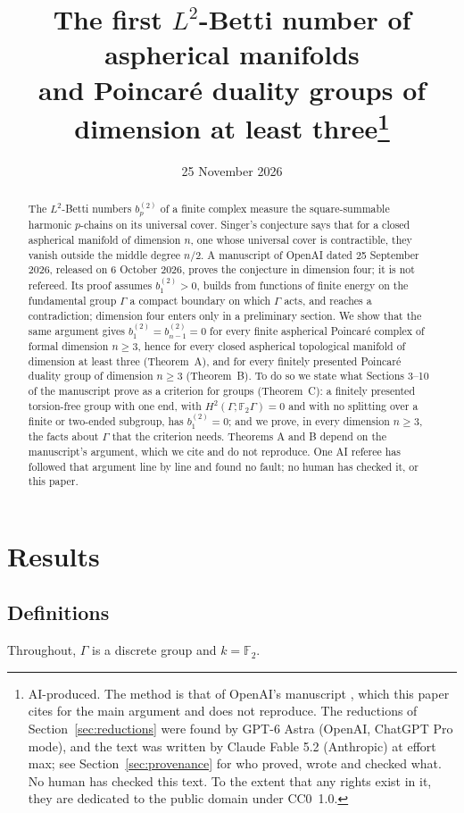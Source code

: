 \documentclass[11pt,a4paper]{article}
\title{The first $L^2$-Betti number of aspherical manifolds\\ and Poincar\'e duality
groups of dimension at least three\thanks{AI-produced. The method is that of
OpenAI's manuscript \cite{O}, which this paper cites for the main argument and does
not reproduce. The reductions of Section~\ref{sec:reductions} were found by GPT-6
Astra (OpenAI, ChatGPT Pro mode), and the text was written by Claude Fable 5.2
(Anthropic) at effort max; see Section~\ref{sec:provenance} for who proved, wrote
and checked what. No human has checked this text. To the extent that any rights
exist in it, they are dedicated to the public domain under CC0~1.0.}}
\author{}
\date{25 November 2026}
\theoremstyle{definition}
\theoremstyle{remark}
\newcommand{\F}{\mathbb{F}}
\newcommand{\Gam}{\Gamma}
\newcommand{\bt}[1]{b^{(2)}_{#1}}
\begin{document}
\maketitle

\begin{abstract}
The $L^2$-Betti numbers $\bt{p}$ of a finite complex measure the square-summable
harmonic $p$-chains on its universal cover. Singer's conjecture says that for a
closed aspherical manifold of dimension $n$, one whose universal cover is
contractible, they vanish outside the middle degree $n/2$. A manuscript of OpenAI dated 25 September 2026,
released on 6 October 2026, proves the conjecture in dimension four; it is not refereed.
Its proof assumes $\bt{1}>0$, builds from functions of finite energy on the
fundamental group $\Gam$ a compact boundary on which $\Gam$ acts, and reaches a
contradiction; dimension four enters only in a preliminary section. We show that
the same argument gives $\bt{1}=\bt{n-1}=0$ for every finite aspherical Poincar\'e
complex of formal dimension $n\ge3$, hence for every closed aspherical topological
manifold of dimension at least three (Theorem~A), and for every finitely presented
Poincar\'e duality group of dimension $n\ge3$ (Theorem~B). To do so we state what
Sections 3--10 of the manuscript prove as a criterion for groups (Theorem~C): a
finitely presented torsion-free group with one end, with
$H^2(\Gam;\F_2\Gam)=0$ and with no splitting over a finite or two-ended subgroup, has
$\bt{1}=0$; and we prove, in every dimension $n\ge3$, the facts about $\Gam$ that the
criterion needs. Theorems A and B depend on the manuscript's argument, which we
cite and do not reproduce. One AI referee has followed that argument line by line
and found no fault; no human has checked it, or this paper.
\end{abstract}

\section{Results}

\subsection{Definitions}\label{sub:defs}
Throughout, $\Gam$ is a discrete group and $k=\F_2$.
\end{document}
